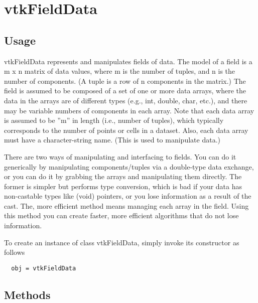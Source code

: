 \section{vtkFieldData}

\subsection{Usage}

 vtkFieldData represents and manipulates fields of data. The model of a field
 is a m x n matrix of data values, where m is the number of tuples, and n
 is the number of components. (A tuple is a row of n components in the
 matrix.) The field is assumed to be composed of a set of one or more data
 arrays, where the data in the arrays are of different types (e.g., int,
 double, char, etc.), and there may be variable numbers of components in
 each array. Note that each data array is assumed to be ''m'' in length
 (i.e., number of tuples), which typically corresponds to the number of
 points or cells in a dataset. Also, each data array must have a
 character-string name. (This is used to manipulate data.)

 There are two ways of manipulating and interfacing to fields. You can do
 it generically by manipulating components/tuples via a double-type data
 exchange, or you can do it by grabbing the arrays and manipulating them
 directly. The former is simpler but performs type conversion, which is bad
 if your data has non-castable types like (void) pointers, or you lose
 information as a result of the cast. The, more efficient method means
 managing each array in the field.  Using this method you can create
 faster, more efficient algorithms that do not lose information.

To create an instance of class vtkFieldData, simply
invoke its constructor as follows
\begin{verbatim}
  obj = vtkFieldData
\end{verbatim}
\subsection{Methods}

